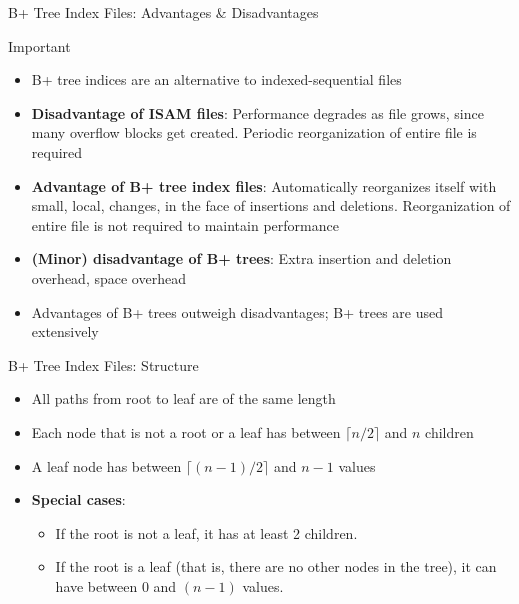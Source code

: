\documentclass[aspectratio=169, xcolor=dvipsnames]{beamer}
\begin{document}
\begin{frame}{B+ Tree Index Files: Advantages \& Disadvantages}
    \begin{alertblock}{Important}
        \begin{itemize}[<+->]
            \item B+ tree indices are an alternative to indexed-sequential files
            \item \textbf{Disadvantage of ISAM files}: Performance degrades as file grows, since many overflow blocks get created. Periodic reorganization of entire file is required
            \item \textbf{Advantage of B+ tree index files}: Automatically reorganizes itself with small, local, changes, in the face of insertions and deletions. Reorganization of entire file is not required to maintain performance
            \item \textbf{(Minor) disadvantage of B+ trees}: Extra insertion and deletion overhead, space overhead
            \item Advantages of B+ trees outweigh disadvantages; B+ trees are used extensively
        \end{itemize}
    \end{alertblock}
\end{frame}

\begin{frame}{B+ Tree Index Files: Structure}
    \begin{itemize}[<+->]
        \item All paths from root to leaf are of the same length
        \item Each node that is not a root or a leaf has between $\lceil n/2 \rceil$ and $n$ children
        \item A leaf node has between $\lceil (n-1)/2 \rceil$ and $n-1$ values
        \item \textbf{Special cases}:
        \begin{itemize}[<+->]
            \item If the root is not a leaf, it has at least 2 children.
            \item If the root is a leaf (that is, there are no other nodes in the tree), it can have between 0 and $(n-1)$ values.
        \end{itemize}
    \end{itemize}
\end{frame}
\end{document}
